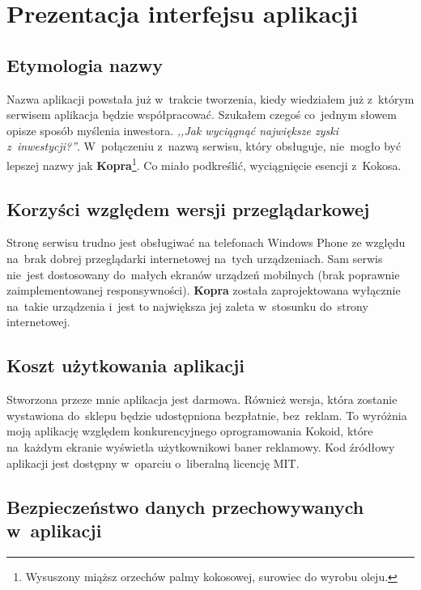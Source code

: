 \documentclass[a4paper,twoside,titlepage,openright]{book}
\begin{document}
\chapter{Prezentacja interfejsu aplikacji}

\section{Etymologia nazwy}

Nazwa aplikacji powstała już w~trakcie tworzenia, kiedy wiedziałem już z~którym serwisem aplikacja będzie współpracować. Szukałem czegoś co~jednym słowem opisze sposób myślenia inwestora. \textit{,,Jak wyciągnąć największe zyski z~inwestycji?''}. W~połączeniu z~nazwą serwisu, który obsługuje, nie~mogło być lepszej nazwy jak \textbf{Kopra}\footnote{Wysuszony miąższ orzechów palmy kokosowej, surowiec do wyrobu oleju.}. Co miało podkreślić, wyciągnięcie esencji z~Kokosa.

\section{Korzyści względem wersji przeglądarkowej}

Stronę serwisu trudno jest obsługiwać na telefonach Windows Phone ze względu na~brak dobrej przeglądarki internetowej na~tych urządzeniach. Sam serwis nie~jest dostosowany do~małych ekranów urządzeń mobilnych (brak poprawnie zaimplementowanej responsywności). \textbf{Kopra} została zaprojektowana wyłącznie na~takie urządzenia i~jest to największa jej zaleta w~stosunku do~strony internetowej. 

\section{Koszt użytkowania aplikacji}

Stworzona przeze mnie aplikacja jest darmowa. Również wersja, która zostanie wystawiona do~sklepu będzie udostępniona bezpłatnie, bez~reklam. To wyróżnia moją aplikację względem konkurencyjnego oprogramowania Kokoid, które na~każdym ekranie wyświetla użytkownikowi baner reklamowy. Kod źródłowy aplikacji jest dostępny w~oparciu o~liberalną licencję MIT.

\section{Bezpieczeństwo danych przechowywanych w~aplikacji}
\end{document}
